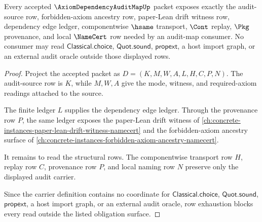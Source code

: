 \begin{theorem}
\label{thm:axiom-dependency-audit-map-obligation-surface}
Every accepted $\AxiomDependencyAuditMapUp$ packet exposes exactly the audit-source row, forbidden-axiom ancestry row, paper-Lean drift witness row, dependency edge ledger, componentwise $\hsame$ transport, $\Cont$ replay, $\Pkg$ provenance, and local $\NameCert$ row needed by an audit-map consumer. No consumer may read $\mathsf{Classical.choice}$, $\mathsf{Quot.sound}$, $\mathsf{propext}$, a host import graph, or an external audit oracle outside those displayed rows.
\end{theorem}
\begin{proof}
Project the accepted packet as $D=(K,M,W,A,L,H,C,P,N)$. The audit-source row is $K$, while $M,W,A$ give the mode, witness, and required-axiom readings attached to the source.

The finite ledger $L$ supplies the dependency edge ledger. Through the provenance row $P$, the same ledger exposes the paper-Lean drift witness of \autoref{ch:concrete-instances-paper-lean-drift-witness-namecert} and the forbidden-axiom ancestry surface of \autoref{ch:concrete-instances-forbidden-axiom-ancestry-namecert}.

It remains to read the structural rows. The componentwise transport row $H$, replay row $C$, provenance row $P$, and local naming row $N$ preserve only the displayed audit carrier.

Since the carrier definition contains no coordinate for $\mathsf{Classical.choice}$, $\mathsf{Quot.sound}$, $\mathsf{propext}$, a host import graph, or an external audit oracle, row exhaustion blocks every read outside the listed obligation surface.
\end{proof}

